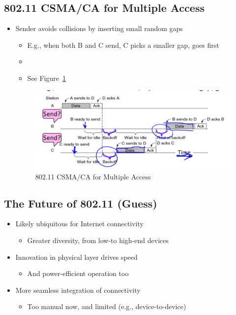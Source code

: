 \documentclass[12pt]{ctexart}   %
\begin{document}
	\subsection{802.11 CSMA/CA for Multiple Access}
	\begin{itemize}
		\item Sender avoids collisions by inserting small random gaps
		\begin{itemize}
			\item E.g., when both B and C send, C picks a smaller gap, goes first
			\item \item See Figure~\ref{fig:3-6-11}
		\end{itemize}
		
		\begin{figure}[h!] %
		\centering
		 \includegraphics[scale=0.7]{images/3-6-11}
		\caption{ 802.11 CSMA/CA for Multiple Access }
		 \label{fig:3-6-11}
		 \end{figure}
	\end{itemize}
	
	\subsection{ The Future of 802.11 (Guess) }
	\begin{itemize}
		\item Likely ubiquitous for Internet connectivity
		\begin{itemize}
			\item Greater diversity, from low-to high-end devices
		\end{itemize}
		
		\item Innovation in physical layer drives speed
		\begin{itemize}
			\item And power-efficient operation too
		\end{itemize}
		
		\item More seamless integration of connectivity
		\begin{itemize}
			\item Too manual now, and limited (e.g., device-to-device)
		\end{itemize}
	\end{itemize}
	
\end{document}
